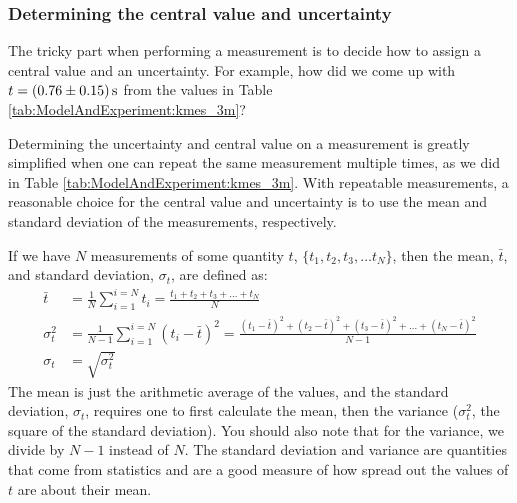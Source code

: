\subsubsection{Determining the central value and uncertainty}
The tricky part when performing a measurement is to decide how to assign a central value and an uncertainty. For example, how did we come up with $t=\SI{0.76 \pm 0.15}{s}$ from the values in Table \ref{tab:ModelAndExperiment:kmes_3m}? 

Determining the uncertainty and central value on a measurement is greatly simplified when one can repeat the same measurement multiple times, as we did in Table \ref{tab:ModelAndExperiment:kmes_3m}. With repeatable measurements, a reasonable choice for the central value and uncertainty is to use the mean and standard deviation of the measurements, respectively.

If we have $N$ measurements of some quantity $t$, $\{t_1, t_2, t_3, \dots t_N\}$, then the mean, $\bar t$, and standard deviation, $\sigma_t$, are defined as:
\begin{align}
\bar t &= \frac{1}{N}\sum_{i=1}^{i=N} t_i=\frac{t_1 +t_2 +t_3 +\dots+ t_N}{N} \\
\sigma_t^2 &=\frac{1}{N-1}\sum_{i=1}^{i=N}(t_i-\bar t)^2 = \frac{(t_1-\bar t)^2+(t_2-\bar t)^2+(t_3-\bar t)^2+\dots+(t_N-\bar t)^2}{N-1} \\
\sigma_t &=\sqrt{\sigma_t^2}
\end{align}
The mean is just the arithmetic average of the values, and the standard deviation, $\sigma_t$, requires one to first calculate the mean, then the variance ($\sigma^2_t$, the square of the standard deviation). You should also note that for the variance, we divide by $N-1$ instead of $N$. The standard deviation and variance are quantities that come from statistics and are a good measure of how spread out the values of $t$ are about their mean.

